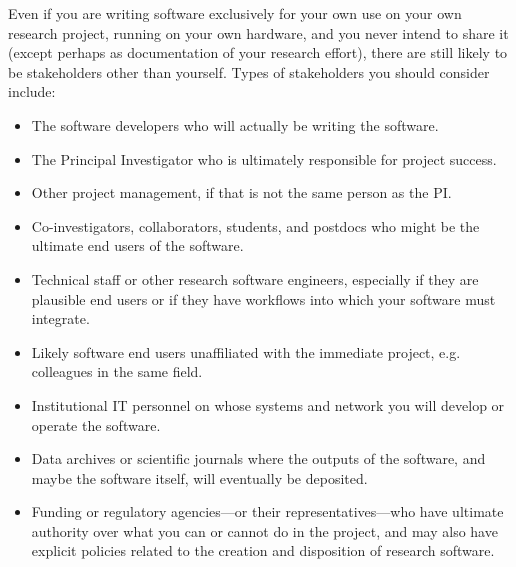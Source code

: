 \documentclass[12pt,oneside]{book}
\begin{document}
Even if you are writing software exclusively for your own use on your own research project, running on your own hardware, and you never intend to share it (except perhaps as documentation of your research effort), there are still likely to be stakeholders other than yourself. Types of stakeholders you should consider include:
\begin{itemize}
\item The software developers who will actually be writing the software.
\item The Principal Investigator who is ultimately responsible for project success.
\item Other project management, if that is not the same person as the PI.
\item Co-investigators, collaborators, students, and postdocs who might be the ultimate end users of the software.
\item Technical staff or other research software engineers, especially if they are plausible end users or if they have workflows into which your software must integrate.
\item Likely software end users unaffiliated with the immediate project, e.g. colleagues in the same field.
\item Institutional IT personnel on whose systems and network you will develop or operate the software.
\item Data archives or scientific journals where the outputs of the software, and maybe the software itself, will eventually be deposited.
\item Funding or regulatory agencies---or their representatives---who have ultimate authority over what you can or cannot do in the project, and may also have explicit policies related to the creation and disposition of research software.
\end{itemize}
\end{document}
